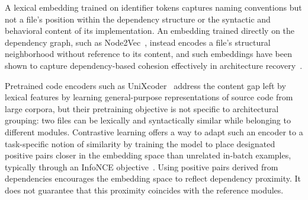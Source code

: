 A lexical embedding trained on identifier tokens captures naming conventions but not a file's position within the dependency structure or the syntactic and behavioral content of its implementation. An embedding trained directly on the dependency graph, such as Node2Vec~\cite{node2vec}, instead encodes a file's structural neighborhood without reference to its content, and such embeddings have been shown to capture dependency-based cohesion effectively in architecture recovery~\cite{negar,structsar}.
 
Pretrained code encoders such as UniXcoder~\cite{unixcoder} address the content gap left by lexical features by learning general-purpose representations of source code from large corpora, but their pretraining objective is not specific to architectural grouping: two files can be lexically and syntactically similar while belonging to different modules. Contrastive learning offers a way to adapt such an encoder to a task-specific notion of similarity by training the model to place designated positive pairs closer in the embedding space than unrelated in-batch examples, typically through an InfoNCE objective~\cite{infonce}. Using positive pairs derived from dependencies encourages the embedding space to reflect dependency proximity. It does not guarantee that this proximity coincides with the reference modules.